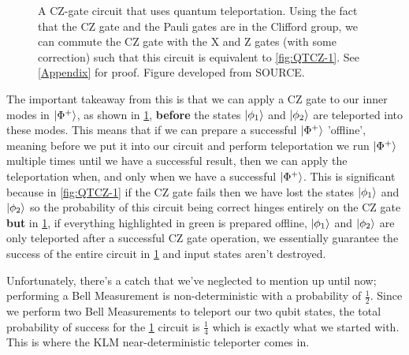 \begin{figure}[H]
\begin{tikzpicture}[x=0.75pt,y=0.75pt,yscale=-1,xscale=1]
\end{tikzpicture}


 \caption{A CZ-gate circuit that uses quantum teleportation. Using the fact that the CZ gate and the Pauli gates are in the Clifford group, we can commute the CZ gate with the X and Z gates (with some correction) such that this circuit is equivalent to \cref{fig:QTCZ-1}. See \ref{Appendix} for proof. Figure developed from SOURCE. }
    \label{fig:QTCZ-2}
\end{figure}

The important takeaway from this is that we can apply a CZ gate to our inner modes in $\ket{\Phi^+}$, as shown in \cref{fig:QTCZ-2}, \textbf{before} the states $\ket{\phi_1}$ and $\ket{\phi_2}$ are teleported into these modes. This means that if we can prepare a successful $\ket{\Phi^+}$ 'offline', meaning before we put it into our circuit and perform teleportation we run $\ket{\Phi^+}$ multiple times until we have a successful result, then we can apply the teleportation when, and only when we have a successful $\ket{\Phi^+}$. This is significant because in \cref{fig:QTCZ-1} if the CZ gate fails then we have lost the states $\ket{\phi_1}$ and $\ket{\phi_2}$ so the probability of this circuit being correct hinges entirely on the CZ gate \textbf{but} in \cref{fig:QTCZ-2}, if everything highlighted in green is prepared offline, $\ket{\phi_1}$ and $\ket{\phi_2}$ are only teleported after a successful CZ gate operation, we essentially guarantee the success of the entire circuit in \cref{fig:QTCZ-2} and input states aren't destroyed.
\par
Unfortunately, there's a catch that we've neglected to mention up until now; performing a Bell Measurement is non-deterministic with a probability of $\frac{1}{2}$. Since we perform two Bell Measurements to teleport our two qubit states, the total probability of success for the \cref{fig:QTCZ-2} circuit is $\frac{1}{4}$ which is exactly what we started with. This is where the KLM near-deterministic teleporter comes in. 

